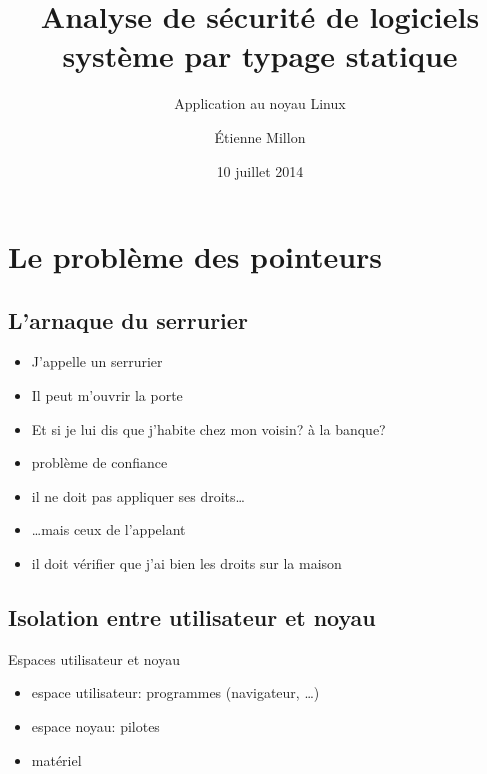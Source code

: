 \documentclass{beamer}
\title{Analyse de sécurité de logiciels système par typage statique}
\subtitle{Application au noyau Linux}
\author{Étienne Millon}
\date{10 juillet 2014}
\begin{document}

\frame{\titlepage}

\frame{\tableofcontents}


\section{Le problème des pointeurs}

\subsection{L'arnaque du serrurier}

\begin{frame}

\begin{itemize}
\item
  J'appelle un serrurier
\item
  Il peut m'ouvrir la porte
\item
  Et si je lui dis que j'habite chez mon voisin? à la banque?
\end{itemize}

\end{frame}
\begin{frame}

\begin{itemize}
\item problème de confiance
\item il ne doit pas appliquer ses droits…
\item …mais ceux de l'appelant
\item il doit vérifier que j'ai bien les droits sur la maison
\end{itemize}

\end{frame}

\subsection{Isolation entre utilisateur et noyau}

\begin{frame}{Espaces utilisateur et noyau}
    \begin{itemize}
        \item espace utilisateur: programmes (navigateur, …)
        \item espace noyau: pilotes
        \item matériel
    \end{itemize}
\end{frame}
\end{document}
